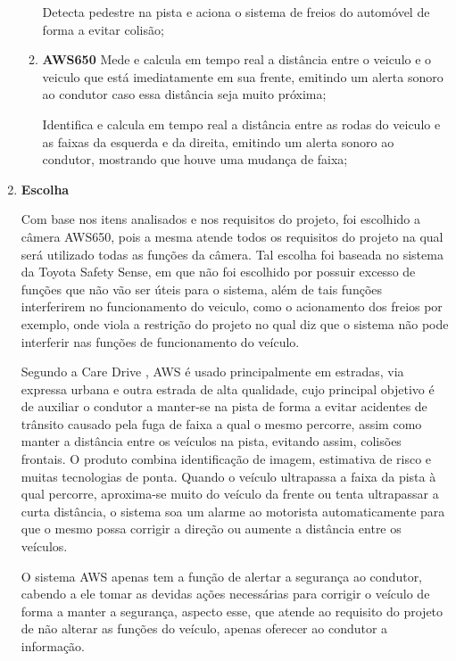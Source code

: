 \begin{enumerate}
\begin{enumerate}
Detecta pedestre na pista e aciona o sistema de freios do automóvel de forma a evitar colisão;

\item \textbf{AWS650}
Mede e calcula em tempo real a distância entre o veiculo e o veiculo que está imediatamente em sua frente, emitindo um alerta sonoro ao condutor caso essa distância seja muito próxima;

Identifica e calcula em tempo real a distância entre as rodas do veiculo e as faixas da esquerda e da direita, emitindo um alerta sonoro ao condutor, mostrando que houve uma mudança de faixa;
\end{enumerate}

\item \textbf{Escolha}

Com base nos itens analisados e nos requisitos do projeto, foi escolhido a câmera AWS650, pois a mesma atende todos os requisitos do projeto na qual será utilizado todas as funções da câmera. Tal escolha foi baseada no sistema  da Toyota Safety Sense, em que não foi escolhido por possuir excesso de funções que não vão ser úteis para o sistema, além de tais funções interferirem no funcionamento do veiculo, como o acionamento dos freios  por exemplo,  onde viola a restrição do projeto no qual diz que o sistema não pode interferir nas funções de funcionamento do veículo.

Segundo a Care Drive \cite{care_drive}, AWS é usado principalmente em estradas, via expressa urbana e outra estrada de alta qualidade, cujo principal objetivo é de auxiliar o condutor a manter-se na pista de forma a evitar acidentes de trânsito causado pela fuga de faixa a qual o mesmo percorre, assim como manter a  distância entre os veículos na pista, evitando assim, colisões frontais. O produto combina identificação de imagem, estimativa de risco e muitas tecnologias de ponta. Quando o veículo ultrapassa a faixa da pista à qual percorre, aproxima-se muito do veículo da frente ou tenta ultrapassar a curta distância, o sistema soa um alarme ao motorista automaticamente para que o mesmo possa corrigir a direção ou aumente a distância entre os veículos.

O sistema AWS apenas tem a função de alertar a segurança ao condutor, cabendo a ele tomar as devidas ações necessárias para corrigir o veículo de forma a manter a segurança, aspecto esse, que atende ao requisito do projeto de não alterar as funções do veículo, apenas oferecer ao condutor a informação.


\end{enumerate}
